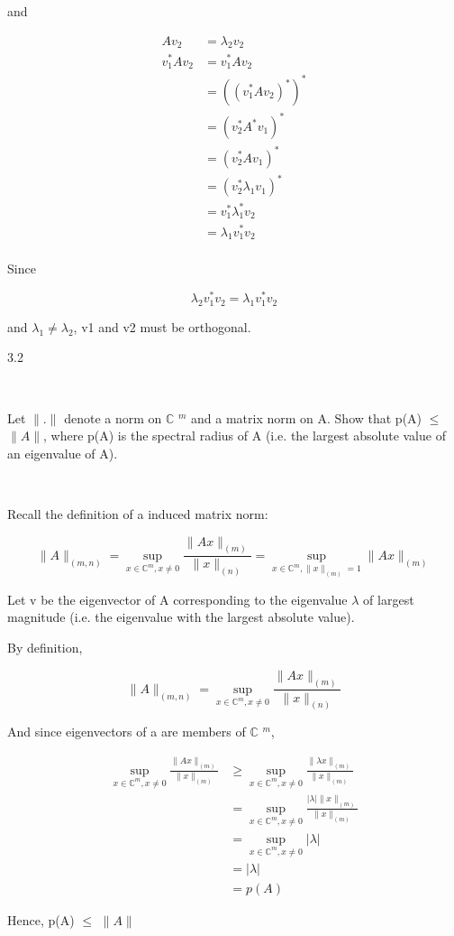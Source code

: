\documentclass[12pt]{article}
\newcommand{\mt}[1]{\ensuremath{#1}}
\newcommand{\bc}{\mt{\mathbb{C}} }       %
\newcommand{\lse}{\mt{\leq} }
\newcommand{\gre}{\mt{\geq} }
\newcommand{\uf}[2]{#1\mt{^{#2}}}
\newcommand{\splt}[1]{\begin{split}#1\end{split}}
\begin{document}
\begin{enumerate}
and

\begin{displaymath}
  \splt{ Av_2 & = \lambda_2 v_2 \\
  v_1^* Av_2 & = v_1^* A v_2 \\
  & = ((v_1^* A v_2)^*)^* \\
  & = (v_2^* A^* v_1)^* \\
  & = (v_2^* A v_1)^* \\
  & = (v_2^* \lambda_1 v_1)^* \\
  & = v_1^* \lambda_1^* v_2 \\
  & = \lambda_1 v_1^* v_2 \\
  }
\end{displaymath}

Since 

\begin{displaymath}
  \lambda_2 v_1^* v_2 = \lambda_1 v_1^* v_2
\end{displaymath}

and $\lambda_1 \neq \lambda_2$, v1 and v2 must be orthogonal.

\end{enumerate}

3.2

\

Let $\|.\|$ denote a norm on \uf{\bc}{m} and a matrix norm on A. Show that p(A) \lse $\|A\|$, where p(A) is the spectral radius of A (i.e. the largest absolute value of an eigenvalue of A).

\

Recall the definition of a induced matrix norm:

\begin{displaymath}
  \|A\|_{(m, n)} = \underset{x \in \bc^m, x \neq 0} \sup \frac{\|Ax\|_{(m)}}{\|x\|_{(n)}} = \underset{x \in \bc^m, \|x\|_{(m)} = 1} \sup \|Ax\|_{(m)}
\end{displaymath}

Let v be the eigenvector of A corresponding to the eigenvalue $\lambda$ of largest magnitude (i.e. the eigenvalue with the largest absolute value).

By definition,

\begin{displaymath}
  \|A\|_{(m, n)} = \underset{x \in \bc^m, x \neq 0} \sup \frac{\|Ax\|_{(m)}}{\|x\|_{(n)}}
\end{displaymath}

And since eigenvectors of a are members of \uf{\bc}{m},

\begin{displaymath}
  \splt{
  \underset{x \in \bc^m, x \neq 0} \sup \frac{\|Ax\|_{(m)}}{\|x\|_{(m)}} & \gre \underset{x \in \bc^m, x \neq 0} \sup \frac{\|\lambda x\|_{(m)}}{\|x\|_{(m)}} \\
  & = \underset{x \in \bc^m, x \neq 0} \sup \frac{|\lambda| \| x\|_{(m)}}{\|x\|_{(m)}} \\
  & = \underset{x \in \bc^m, x \neq 0} \sup |\lambda| \\
  & = |\lambda| \\ 
  & = p(A)
  }
\end{displaymath}

Hence, p(A) \lse $\|A\|$
\end{document}
